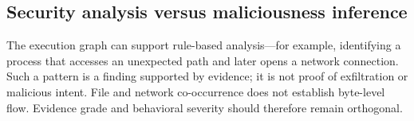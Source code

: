 \subsection{Security analysis versus maliciousness inference}
The execution graph can support rule-based analysis---for example, identifying a process that accesses an unexpected path and later opens a network connection. Such a pattern is a finding supported by evidence; it is not proof of exfiltration or malicious intent. File and network co-occurrence does not establish byte-level flow. Evidence grade and behavioral severity should therefore remain orthogonal.
